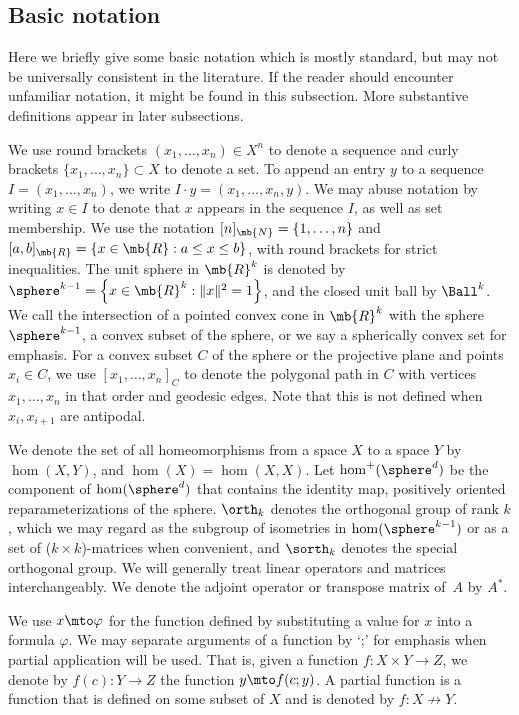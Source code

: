 \subsection{Basic notation}

Here we briefly give some basic notation which is mostly standard, but may not be universally consistent in the literature. If the reader should encounter unfamiliar notation, it might be found in this subsection. More substantive definitions appear in later subsections.

We use round brackets
$(x_1,\dots,x_n) \in X^n$ to denote a sequence and curly brackets $\{x_1,\dots,x_n\} \subset X$ to denote a set.
To append an entry $y$ to a sequence $I = (x_1,\dots,x_n)$, we write $I \cdot y = (x_1,\dots,x_{n},y)$.
We may abuse notation by writing $x\in I$ to denote that $x$ appears in the sequence $I$, as well as set membership.
We use the notation $[n]_{\mb{N}} = \{1,\dots,n\}$ and $[a,b]_{\mb{R}} = \{x \in \mb{R} : a \leq x \leq b\}$,
with round brackets for strict inequalities.
The unit sphere in $\mb{R}^k$ is denoted by $\sphere^{k-1} = \left\{ x\in \mb{R}^k : \|x\|^2 = 1 \right\}$, and the closed unit ball by $\Ball^k$.
We call the intersection of a pointed convex cone in $\mb{R}^k$ with the sphere $\sphere^{k-1}$, a convex subset of the sphere, or we say a spherically convex set for emphasis.
For a convex subset $C$ of the sphere or the projective plane and points $x_i \in C$, we use $[x_1,\dots,x_n]_C$ to denote the polygonal path in $C$ with vertices $x_1,\dots,x_n$ in that order and geodesic edges. Note that this is not defined when $x_i,x_{i+1}$ are antipodal.

We denote the set of all homeomorphisms from a space $X$ to a space $Y$ by
$\hom(X,Y)$,
and $\hom(X) = \hom(X,X)$.
Let $\hom^+(\sphere^d)$ be
the component of $\hom(\sphere^d)$ that contains the identity map,
\ie positively oriented reparameterizations of the sphere.
$\orth_k$ denotes the orthogonal group of rank $k$, which we may regard as the subgroup of isometries in $\hom(\sphere^{k-1})$ or as a set of ($k\times k$)-matrices when convenient, and $\sorth_k$ denotes the special orthogonal group.
We will generally treat linear operators and matrices interchangeably.
We denote the adjoint operator or transpose matrix of~$A$ by $A^*$.	

We use $x \mto \varphi$ for the function defined by substituting a value for $x$ into a formula $\varphi$.
We may separate arguments of a function by `;' for emphasis when partial application will be used. That is, given a function $f : X \times Y \to Z$, we denote by $f(c) : Y \to Z$ the function $y \mto f(c;y)$.
A partial function is a function that is defined on some subset of $X$ and is denoted by $f:X \not\to Y$.

